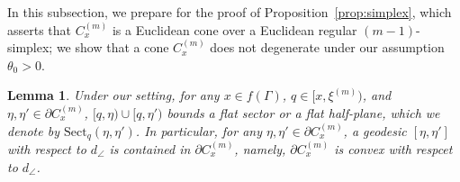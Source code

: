 \documentclass[12pt]{amsart}
\numberwithin{equation}{section}
\theoremstyle{plain}
\newtheorem{Lemma}[Theorem]{Lemma}
\theoremstyle{definition}
\theoremstyle{remark}
\newcommand{\xxi}[1]{\xi^{(#1)}}
\newcommand{\ray}[1]{[#1)}
\newcommand{\sect}[3][]{\mathrm{Sect}_{#1}(#2,#3)}
\newcommand{\cone}[2][]{C_{#1}^{(#2)}}
\newcommand{\zure}{\theta_0}
\begin{document}
In this subsection, we prepare for the proof of
Proposition~\ref{prop:simplex}, which asserts that $\cone[x]{m}$ is a
Euclidean cone over a Euclidean regular $(m-1)$-simplex; we show that a
cone $\cone[x]{m}$ does not degenerate under our assumption $\zure>0$.

%
%

\begin{Lemma}
\label{lem:sector_exists}
 Under our setting, for any $x \in f(\Gamma)$, $q \in \ray{x,\xxi{m}}$,
 and $\eta, \eta' \in \partial \cone[x]{m}$, 
 $\ray{q,\eta}\cup \ray{q,\eta'}$ bounds a flat sector or a flat 
 half-plane,  which we denote by $\sect[q]{\eta}{\eta'}$. 
 In particular, for any $\eta, \eta' \in \partial \cone[x]{m}$, a
 geodesic $[\eta,\eta']$ with respect to $d_{\angle}$ is contained in
 $\partial \cone[x]{m}$, namely, $\partial \cone[x]{m}$ is convex with
 respcet to $d_{\angle}$. 
\end{Lemma}
\end{document}
